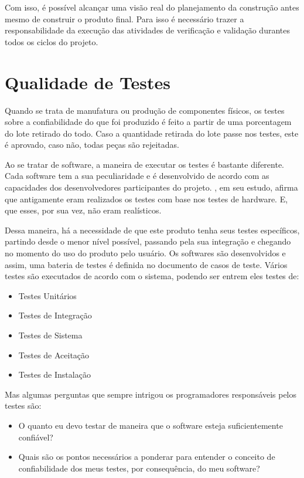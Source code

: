 Com isso, é possível alcançar uma visão real do planejamento da construção
antes mesmo de construir o produto final. Para isso é necessário trazer
a responsabilidade da execução das atividades de verificação e validação
durantes todos os ciclos do projeto.

\section{Qualidade de Testes}
Quando se trata de manufatura ou produção de componentes físicos, os testes
sobre a confiabilidade do que foi produzido é feito a partir de uma porcentagem
do lote retirado do todo. Caso a quantidade retirada do lote passe nos testes,
este é aprovado, caso não, todas peças são rejeitadas.

Ao se tratar de software, a maneira de executar os testes é bastante diferente.
Cada software tem a sua peculiaridade e é desenvolvido de acordo com as
capacidades dos desenvolvedores participantes do projeto. \cite{e08}, em seu estudo,
afirma que antigamente eram realizados os testes com base nos testes de hardware.
E, que esses, por sua vez, não eram realísticos.

Dessa maneira, há a necessidade de que este produto tenha seus testes específicos,
partindo desde o menor nível possível, passando pela sua integração e chegando
no momento do uso do produto pelo usuário.
Os softwares são desenvolvidos e assim, uma bateria de testes é definida no
documento de casos de teste. Vários testes são  executados de acordo com o sistema,
podendo ser entrem eles testes de:

\begin{itemize}
\item Testes Unitários
\item Testes de Integração
\item Testes de Sistema
\item Testes de Aceitação
\item Testes de Instalação
\end{itemize}

Mas algumas perguntas que sempre intrigou os programadores responsáveis pelos testes são:

\begin{itemize}
\item O quanto eu devo testar de maneira que o software esteja suficientemente
confiável?
\item Quais são os pontos necessários a ponderar para entender o conceito
de confiabilidade dos meus testes, por consequência, do meu software?
\end{itemize}


